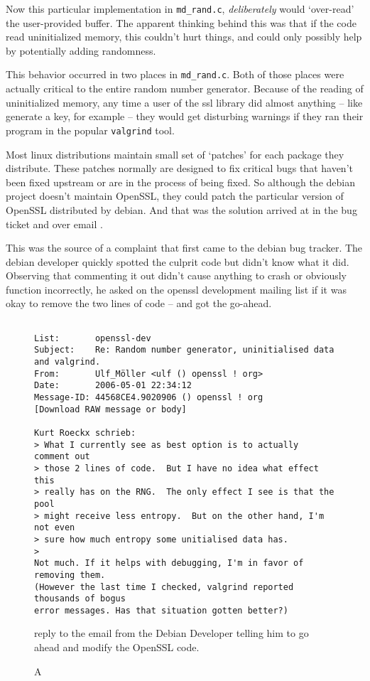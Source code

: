 \documentclass[conference]{IEEEtran}
\begin{document}
Now this particular implementation in \verb|md_rand.c|,
\emph{deliberately} would `over-read' the user-provided buffer. The
apparent thinking behind this was that if the code read uninitialized
memory, this couldn't hurt things, and could only possibly help by
potentially adding randomness.

This behavior occurred in two places in \verb|md_rand.c|. Both of
those places were actually critical to the entire random number
generator. Because of the reading of uninitialized memory, any time a
user of the ssl library did almost anything -- like generate a key,
for example -- they would get disturbing warnings if they ran their
program in the popular \verb|valgrind| tool.

Most linux distributions maintain small set of `patches' for each
package they distribute. These patches normally are designed to fix
critical bugs that haven't been fixed upstream or are in the process
of being fixed. So although the debian project doesn't maintain
OpenSSL, they could patch the particular version of OpenSSL
distributed by debian. And that was the solution arrived at in the bug
ticket and over email \cite{2}\cite{4}.

This was the source of a complaint that first came to the debian bug
tracker\cite{2}. The debian developer quickly spotted the culprit code
but didn't know what it did. Observing that commenting it out didn't
cause anything to crash or obviously function incorrectly, he asked on
the openssl development mailing list if it was okay to remove the two
lines of code -- and got the go-ahead.

\begin{figure*}[!t]
\centering
\begin{displayquote}
\begin{verbatim}

List:       openssl-dev
Subject:    Re: Random number generator, uninitialised data and valgrind.
From:       Ulf_Möller <ulf () openssl ! org>
Date:       2006-05-01 22:34:12
Message-ID: 44568CE4.9020906 () openssl ! org
[Download RAW message or body]

Kurt Roeckx schrieb:
> What I currently see as best option is to actually comment out
> those 2 lines of code.  But I have no idea what effect this
> really has on the RNG.  The only effect I see is that the pool
> might receive less entropy.  But on the other hand, I'm not even
> sure how much entropy some unitialised data has.
>   
Not much. If it helps with debugging, I'm in favor of removing them. 
(However the last time I checked, valgrind reported thousands of bogus 
error messages. Has that situation gotten better?)
\end{verbatim}
\end{displayquote}
\caption A reply to the email from the Debian Developer telling him to go ahead and modify the OpenSSL code.\cite{4}
\end{figure*}
\end{document}
